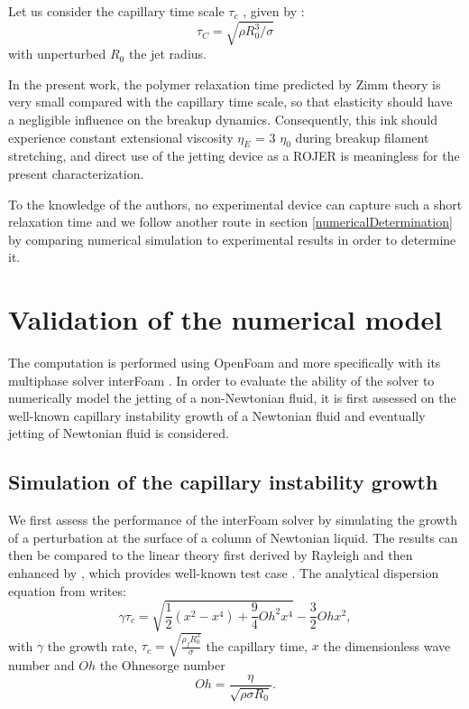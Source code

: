 \documentclass[twocolumn,10pt]{asme2ej}
\begin{document}
Let us consider the capillary time scale $\tau_c$ , given by :
\begin{equation}
    \tau_C= \sqrt{\rho R_0^3 / \sigma}
\end{equation}
with unperturbed $R_0$ the jet radius. 

In the present work, the polymer relaxation time predicted by Zimm theory is very small compared with the capillary time scale, so that elasticity should have a negligible influence on the breakup dynamics. Consequently, this ink should experience constant extensional viscosity $\eta_E$ = 3 $\eta_0$ during breakup filament stretching, and direct use of the jetting device as a ROJER \cite{keshavarz2015studying} is meaningless for the present characterization. 

To the knowledge of the authors, no experimental device can capture such a short relaxation time and we follow another route in section \ref{numericalDetermination} by comparing numerical simulation to experimental results in order to determine it.

\section{Validation of the numerical model}
The computation is performed using OpenFoam and more specifically with its multiphase solver interFoam \cite{deshpande2012evaluating}. In order to evaluate the ability of the solver to numerically model the jetting of a non-Newtonian fluid, it is first assessed on the well-known capillary instability growth of a Newtonian fluid and eventually jetting of Newtonian fluid is considered.

\subsection{Simulation of the capillary instability growth}
We first assess the performance of the interFoam solver by simulating the growth of a perturbation at the surface of a column of Newtonian liquid. The results can then be compared to the linear theory first derived by Rayleigh \cite{rayleigh1892xvi} and then enhanced by \cite{chandrasekhar2013hydrodynamic}, which provides well-known test case \cite{delteil2011numerical,cervone2010simulation}.
The analytical dispersion equation from \cite{chandrasekhar2013hydrodynamic} writes:
\begin{equation}
    \gamma \tau_c = \sqrt{\frac{1}{2}(x^{2}-x^{4}) + \frac{9}{4}Oh^{2}x^{4}}-\frac{3}{2}Oh x^{2},
    \label{eq:growthRateAnalytical}
\end{equation}
with $\gamma$ the growth rate, $\displaystyle \tau_c = \sqrt{\frac{\rho_f R_0^3}{\sigma}}$ the capillary time, $x$ the dimensionless wave number and $Oh$ the Ohnesorge number
\begin{equation}
    Oh=\frac{\eta}{\sqrt{\rho \sigma R_0}}.
    \label{eq:Oh2}
\end{equation} 
\end{document}
